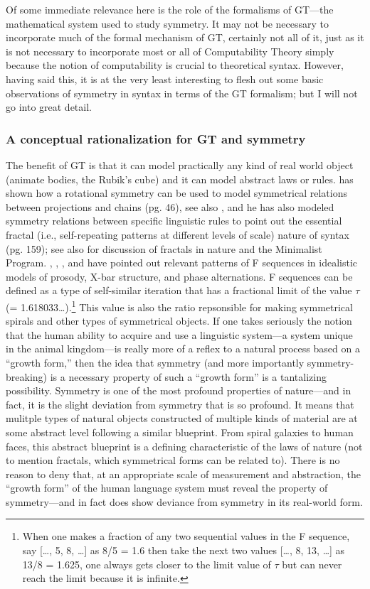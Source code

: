 \documentclass[11pt,twoside]{article}
\theoremstyle{plain}
\numberwithin{equation}{section}
\theoremstyle{definition}
\newtheorem{phrase string}{Phrase String}
\begin{document}
Of some immediate relevance here is the role of the formalisms of GT---the mathematical system used to study symmetry. It may not be necessary to incorporate much of the formal mechanism of GT, certainly not all of it, just as it is not necessary to incorporate most or all of Computability Theory simply because the notion of computability is crucial to theoretical syntax. However, having said this, it is at the very least interesting to flesh out some basic observations of symmetry in syntax in terms of the GT formalism; but I will not go into great detail.

\subsubsection{A conceptual rationalization for GT and symmetry} 
The benefit of GT is that it can model practically any kind of real world object (animate bodies, the Rubik's cube) and it can model abstract laws or rules. \cite{boeckx08bare} has shown how a rotational symmetry can be used to model symmetrical relations between projections and chains (pg. 46), see also \cite{uriagereka:1998}, and he has also modeled symmetry relations between specific linguistic rules to point out the essential fractal (i.e., self-repeating patterns at different levels of scale) nature of syntax (pg. 159); see also \cite{boeckxuri:2007} for discussion of fractals in nature and the Minimalist Program. \cite{medeiros:2008}, \cite{soschen:2008}, \cite{idsardi:2008}, and \cite{ppuriagereka:2008} have pointed out relevant patterns of F sequences in idealistic models of prosody, X-bar structure, and phase alternations. F sequences can be defined as a type of self-similar iteration that has a fractional limit of the value $\tau$ (= 1.618033\dots).\footnote{When one makes a fraction of any two sequential values in the F sequence, say [\dots, 5, 8, \dots] as 8/5 = 1.6 then take the next two values [\dots, 8, 13, \dots] as 13/8 = 1.625, one always gets closer to the limit value of $\tau$ but can never reach the limit because it is infinite.} This value is also the ratio repsonsible for making symmetrical spirals and other types of symmetrical objects.
If one takes seriously the notion that the human ability to acquire and use a linguistic system---a system unique in the animal kingdom---is really more of a reflex to a natural process based on a ``growth form,'' then the idea that symmetry (and more importantly symmetry-breaking) is a necessary property of such a ``growth form'' is a tantalizing possibility. Symmetry is one of the most profound properties of nature---and in fact, it is the slight deviation from symmetry that is so profound. It means that mulitple types of natural objects constructed of multiple kinds of material are at some abstract level following a similar blueprint. From spiral galaxies to human faces, this abstract blueprint is a defining characteristic of the laws of nature (not to mention fractals, which symmetrical forms can be related to). There is no reason to deny that, at an appropriate scale of measurement and abstraction, the ``growth form'' of the human language system must reveal the property of symmetry---and in fact does show deviance from symmetry in its real-world form.
\end{document}
